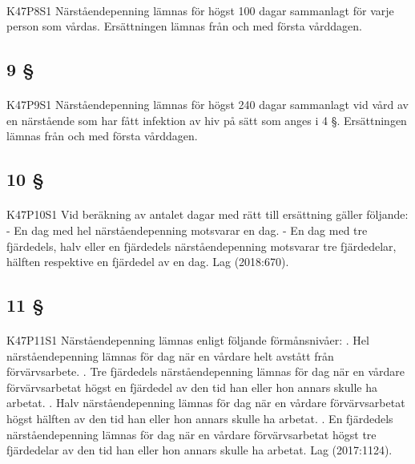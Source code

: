 \documentclass[a4paper,notitlepage,openany,10pt]{book}
\begin{document}
\paragraph*{}
{\tiny K47P8S1}
Närståendepenning lämnas för högst 100 dagar sammanlagt för varje person som vårdas. Ersättningen lämnas från och med första vårddagen.
\subsection*{9 §}
\paragraph*{}
{\tiny K47P9S1}
Närståendepenning lämnas för högst 240 dagar sammanlagt vid vård av en närstående som har fått infektion av hiv på sätt som anges i 4 §. Ersättningen lämnas från och med första vårddagen.
\subsection*{10 §}
\paragraph*{}
{\tiny K47P10S1}
Vid beräkning av antalet dagar med rätt till ersättning gäller följande:
\newline - En dag med hel närståendepenning motsvarar en dag.
\newline - En dag med tre fjärdedels, halv eller en fjärdedels närståendepenning motsvarar tre fjärdedelar, hälften respektive en fjärdedel av en dag.
Lag (2018:670).
\subsection*{11 §}
\paragraph*{}
{\tiny K47P11S1}
Närståendepenning lämnas enligt följande förmånsnivåer:
. Hel närståendepenning lämnas för dag när en vårdare helt avstått från förvärvsarbete.
. Tre fjärdedels närståendepenning lämnas för dag när en vårdare förvärvsarbetat högst en fjärdedel av den tid han eller hon annars skulle ha arbetat.
. Halv närståendepenning lämnas för dag när en vårdare förvärvsarbetat högst hälften av den tid han eller hon annars skulle ha arbetat.
. En fjärdedels närståendepenning lämnas för dag när en vårdare förvärvsarbetat högst tre fjärdedelar av den tid han eller hon annars skulle ha arbetat.
Lag (2017:1124).
\end{document}
